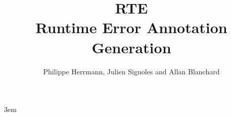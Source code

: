 \documentclass{frama-c-book}
\title{RTE\\\bigskip Runtime Error Annotation Generation}
\author{Philippe Herrmann, Julien Signoles and Allan Blanchard}
\begin{document}
\sloppy
\emergencystretch 3em

\maketitle


\end{document}
